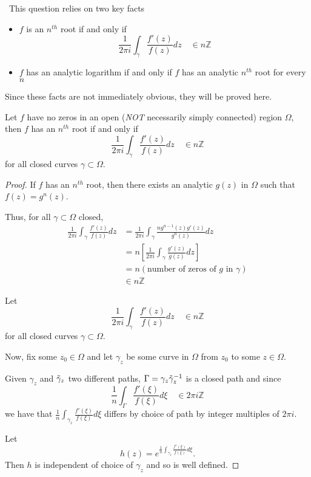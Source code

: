 \documentclass[12pt]{Homework}
\begin{document}
\begin{solution}$\,$
This question relies on two key facts

\begin{itemize}[leftmargin=2.5cm]
    \item $f$ is an $n^{th}$ root if and only if $$\frac{1}{2\pi i}\int_\gamma\frac{f'(z)}{f(z)}dz\quad\in n\mathbb{Z}$$
    \item $f$ has an analytic logarithm if and only if $f$ has an analytic $n^{th}$ root for every $n$
\end{itemize}

Since these facts are not immediately obvious, they will be proved here.

\begin{claim} Let $f$ have no zeros in an open (\textit{NOT} necessarily simply connected) region $\Omega$, then $f$ has an $n^{th}$ root if and only if $$\frac{1}{2\pi i}\int_{\gamma}\frac{f'(z)}{f(z)}dz\quad\in n\mathbb{Z}$$ for all closed curves $\gamma\subset\Omega$.
\begin{proof} \boxed{\implies} If $f$ has an $n^{th}$ root, then there exists an analytic $g(z)$ in $\Omega$ such that $f(z)=g^n(z)$.

Thus, for all $\gamma\subset\Omega$ closed, \begin{align*}
    \frac{1}{2\pi i}\int_\gamma\frac{f'(z)}{f(z)}dz&=\frac{1}{2\pi i}\int_\gamma\frac{ng^{n-1}(z)g'(z)}{g^n(z)}dz\\
    &=n\left[\frac{1}{2\pi i}\int_\gamma\frac{g'(z)}{g(z)}dz\right]\\
    &=n(\text{number of zeros of }g\text{ in }\gamma)\\
    &\in n\mathbb{Z}
\end{align*}

\boxed{\impliedby} Let $$\frac{1}{2\pi i}\int_{\gamma}\frac{f'(z)}{f(z)}dz\quad\in n\mathbb{Z}$$ for all closed curves $\gamma\subset\Omega$.

Now, fix some $z_0\in\Omega$ and let $\gamma_z$ be some curve in $\Omega$ from $z_0$ to some $z\in\Omega$.

Given $\gamma_z$ and $\Tilde{\gamma}_z$ two different paths, $\Gamma=\gamma_z\Tilde{\gamma}_z^{-1}$ is a closed path and since $$\frac{1}{n}\int_\Gamma\frac{f'(\xi)}{f(\xi)}d\xi\quad\in 2\pi i\mathbb{Z}$$ we have that $\displaystyle \frac{1}{n}\int_{\gamma_z}\frac{f'(\xi)}{f(\xi)}d\xi$ differs by choice of path by integer multiples of $2\pi i.$

Let $$h(z)=e^{\frac{1}{n}\int_{\gamma_z}\frac{f'(\xi)}{f(\xi)}d\xi}.$$ Then $h$ is independent of choice of $\gamma_z$ and so is well defined.


\end{proof}
\end{claim}
\end{solution}
\end{document}
